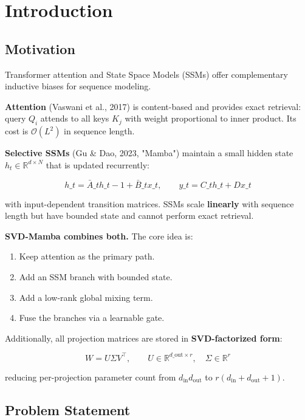 
\section{Introduction}

\subsection{Motivation}

Transformer attention and State Space Models (SSMs) offer complementary 
inductive biases for sequence modeling.

\textbf{Attention} (Vaswani et al., 2017) is content-based and provides exact 
retrieval: query $Q_i$ attends to all keys $K_j$ with weight proportional 
to inner product. Its cost is $\mathcal{O}(L^2)$ in sequence length.

\textbf{Selective SSMs} (Gu \& Dao, 2023, "Mamba") maintain a small hidden state 
$h_t \in \mathbb{R}^{d \times N}$ that is updated recurrently:

\[
h\_t = \bar{A}\_t h\_{t-1} + \bar{B}\_t x\_t, \qquad
y\_t = C\_t h\_t + D x\_t
\tag{1.1}
\]

with input-dependent transition matrices. SSMs scale \textbf{linearly} with 
sequence length but have bounded state and cannot perform exact retrieval.

\textbf{SVD-Mamba combines both.} The core idea is:

\begin{enumerate}
\item Keep attention as the primary path.
\item Add an SSM branch with bounded state.
\item Add a low-rank global mixing term.
\item Fuse the branches via a learnable gate.

\end{enumerate}
Additionally, all projection matrices are stored in \textbf{SVD-factorized form}:

\[
W = U \Sigma V^\top, \qquad U \in \mathbb{R}^{d\_\text{out} \times r}, \quad \Sigma \in \mathbb{R}^r
\tag{1.2}
\]

reducing per-projection parameter count from $d_\text{in} d_\text{out}$ 
to $r(d_\text{in} + d_\text{out} + 1)$.

\subsection{Problem Statement}

